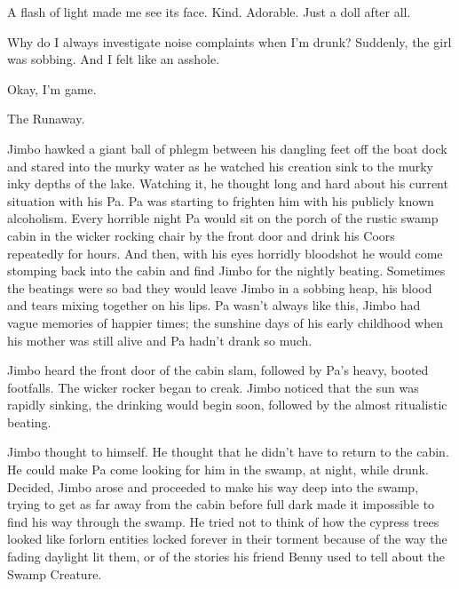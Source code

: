 A flash of light made me see its face. Kind. Adorable. Just a doll
after all.



Why do I always investigate noise complaints when I'm drunk?
Suddenly, the girl was sobbing. And I felt like an asshole. 

 





Okay, I'm game.











The Runaway.







Jimbo hawked a giant ball of phlegm between his dangling feet off
the boat dock and stared into the murky water as he watched his
creation sink to the murky inky depths of the lake. Watching it, he
thought long and hard about his current situation with his Pa. Pa
was starting to frighten him with his publicly known alcoholism.
Every horrible night Pa would sit on the porch of the rustic swamp
cabin in the wicker rocking chair by the front door and drink his
Coors repeatedly for hours. And then, with his eyes horridly
bloodshot he would come stomping back into the cabin and find Jimbo
for the nightly beating. Sometimes the beatings were so bad they
would leave Jimbo in a sobbing heap, his blood and tears mixing
together on his lips. Pa wasn't always like this, Jimbo had
vague memories of happier times; the sunshine days of his early
childhood when his mother was still alive and Pa hadn't drank
so much.

Jimbo heard the front door of the cabin slam, followed by
Pa's heavy, booted footfalls. The wicker rocker began to
creak. Jimbo noticed that the sun was rapidly sinking, the drinking
would begin soon, followed by the almost ritualistic beating.

Jimbo thought to himself. He thought that he didn't have to
return to the cabin. He could make Pa come looking for him in the
swamp, at night, while drunk. Decided, Jimbo arose and proceeded to
make his way deep into the swamp, trying to get as far away from
the cabin before full dark made it impossible to find his way
through the swamp. He tried not to think of how the cypress trees
looked like forlorn entities locked forever in their torment
because of the way the fading daylight lit them, or of the stories
his friend Benny used to tell about the Swamp Creature.

